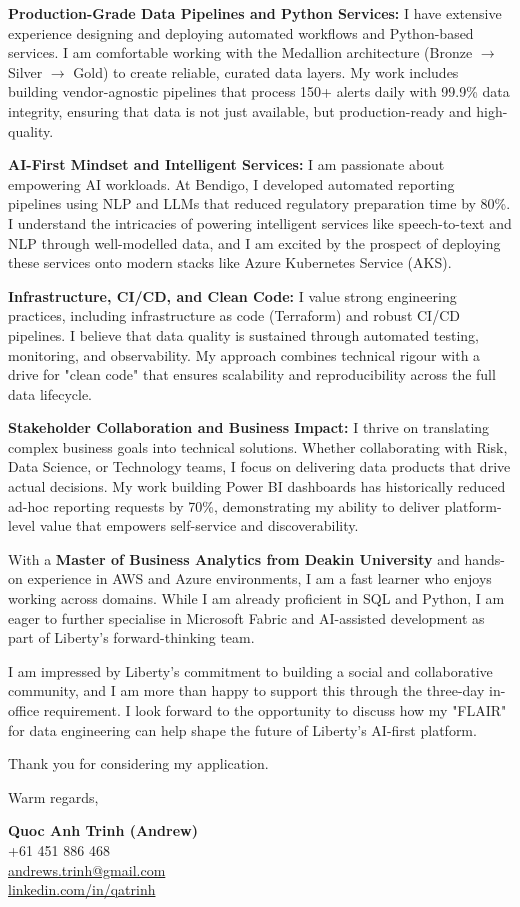 \documentclass[11pt, a4paper]{article}
\begin{document}
\textbf{Production-Grade Data Pipelines and Python Services:}
I have extensive experience designing and deploying automated workflows and Python-based services. I am comfortable working with the Medallion architecture (Bronze $\rightarrow$ Silver $\rightarrow$ Gold) to create reliable, curated data layers. My work includes building vendor-agnostic pipelines that process 150+ alerts daily with 99.9\% data integrity, ensuring that data is not just available, but production-ready and high-quality.

\textbf{AI-First Mindset and Intelligent Services:}
I am passionate about empowering AI workloads. At Bendigo, I developed automated reporting pipelines using NLP and LLMs that reduced regulatory preparation time by 80\%. I understand the intricacies of powering intelligent services like speech-to-text and NLP through well-modelled data, and I am excited by the prospect of deploying these services onto modern stacks like Azure Kubernetes Service (AKS).

\textbf{Infrastructure, CI/CD, and Clean Code:}
I value strong engineering practices, including infrastructure as code (Terraform) and robust CI/CD pipelines. I believe that data quality is sustained through automated testing, monitoring, and observability. My approach combines technical rigour with a drive for "clean code" that ensures scalability and reproducibility across the full data lifecycle.

\textbf{Stakeholder Collaboration and Business Impact:}
I thrive on translating complex business goals into technical solutions. Whether collaborating with Risk, Data Science, or Technology teams, I focus on delivering data products that drive actual decisions. My work building Power BI dashboards has historically reduced ad-hoc reporting requests by 70\%, demonstrating my ability to deliver platform-level value that empowers self-service and discoverability.

With a \textbf{Master of Business Analytics from Deakin University} and hands-on experience in AWS and Azure environments, I am a fast learner who enjoys working across domains. While I am already proficient in SQL and Python, I am eager to further specialise in Microsoft Fabric and AI-assisted development as part of Liberty’s forward-thinking team.

I am impressed by Liberty's commitment to building a social and collaborative community, and I am more than happy to support this through the three-day in-office requirement. I look forward to the opportunity to discuss how my "FLAIR" for data engineering can help shape the future of Liberty’s AI-first platform.

Thank you for considering my application.

\vspace{20pt}

Warm regards,

\vspace{30pt}

\textbf{Quoc Anh Trinh (Andrew)}\\
+61 451 886 468\\
\href{mailto:andrews.trinh@gmail.com}{andrews.trinh@gmail.com}\\
\href{https://www.linkedin.com/in/qatrinh}{linkedin.com/in/qatrinh}
\end{document}

